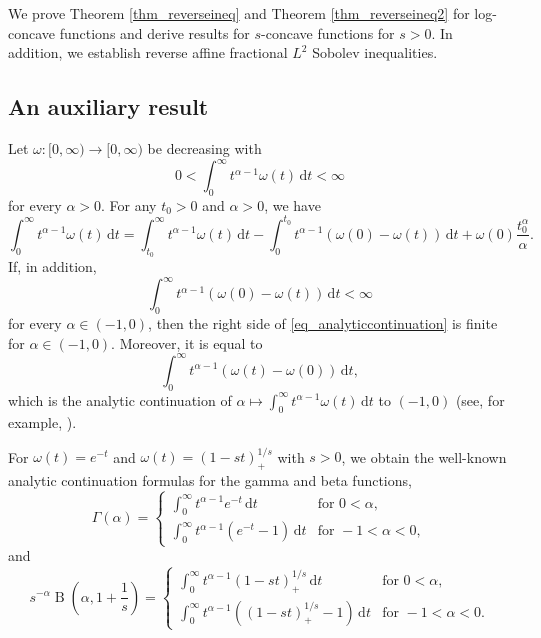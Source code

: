 \documentclass{amsart}
\newcommand{\Beta}{\operatorname{B}}
\renewcommand{\d}{\,\mathrm{d}}
\newcommand{\pl}[1]{#1_{\scriptscriptstyle +}}
\begin{document}
We prove Theorem \ref{thm_reverseineq} and Theorem \ref{thm_reverseineq2} for log-concave functions and derive results 
for $s$-concave functions for $s> 0$. In addition, we establish reverse affine fractional $L^2$ Sobolev inequalities.

\subsection{An auxiliary result}

Let $\omega\colon[0,\infty) \to [0,\infty)$ be decreasing with 
$$0<\int_0^{\infty } t^{\alpha-1} \omega (t ) \d t<\infty$$ 
for every $\alpha>0$. For any $t_0 > 0$ and $\alpha>0$, we have
\begin{equation}
    \label{eq_analyticcontinuation}
    \int_0^{\infty } t^{\alpha-1} \omega(t) \d t=\int_{ t_0}^{\infty } t^{\alpha-1} \omega(t) \d t-\int_0^{ t_0} t^{\alpha-1} (\omega(0)-\omega(t)) \d t+ \omega(0) \frac{ t_0^\alpha}{\alpha}.
\end{equation}
If, in addition, 
\begin{equation}
    \label{eq_growthcondition_negative}
    \int_0^\infty t^{\alpha-1} (\omega(0) - \omega(t))\d t<\infty
\end{equation}
for every $\alpha \in (-1,0)$, then the right side of \eqref{eq_analyticcontinuation} is finite for $\alpha \in (-1,0)$. Moreover, it is equal to
\[\int_0^\infty t^{\alpha-1} (\omega(t)-\omega(0)) \d t,\]
which is the analytic continuation of $\alpha \mapsto \int_0^\infty t^{\alpha-1} \omega(t) \d t$ to $(-1,0)$ (see, for example, \cite[Section 1.3]{GelfandShilov}).

For $\omega(t)=e^{-t}$ and $\omega(t) = \pl{(1-s t)}^{1/s}$ with $s>0$, we obtain the well-known analytic continuation formulas for the gamma and beta functions, 
\begin{equation}
\label{eq_gammacontinuation}
\Gamma(\alpha) =  
\begin{cases}
 \int_0^{\infty } t^{\alpha-1} e^{-t} \d t &\text{for } 0<\alpha, \\[4pt]
 \int_0^{\infty } t^{\alpha-1}  (e^{-t}-1) \d t &\text{for } -1<\alpha<0,
\end{cases}
\end{equation}
and
\begin{equation}
\label{eq_betacontinuation}
s^{-\alpha} \Beta(\alpha,1+\frac 1s) = 
\begin{cases}
 \int_0^{\infty } t^{\alpha-1} \pl{(1-s t)}^{1/s} \d t &\text{for } 0<\alpha, \\[4pt]
 \int_0^{\infty } t^{\alpha-1} (\pl{(1-s t)}^{1/s}-1) \d t &\text{for } -1<\alpha<0.
\end{cases}
\end{equation}
\end{document}
